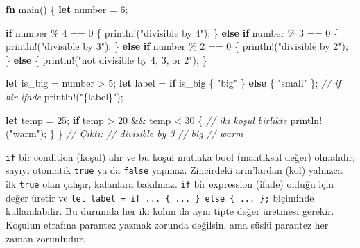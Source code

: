 \documentclass[12pt,a4paper]{article}
\newenvironment{Shaded}{}{}
\newcommand{\CommentTok}[1]{\textcolor[rgb]{0.38,0.63,0.69}{\textit{#1}}}
\newcommand{\ControlFlowTok}[1]{\textcolor[rgb]{0.00,0.44,0.13}{\textbf{#1}}}
\newcommand{\DecValTok}[1]{\textcolor[rgb]{0.25,0.63,0.44}{#1}}
\newcommand{\FunctionTok}[1]{\textcolor[rgb]{0.02,0.16,0.49}{#1}}
\newcommand{\KeywordTok}[1]{\textcolor[rgb]{0.00,0.44,0.13}{\textbf{#1}}}
\newcommand{\NormalTok}[1]{#1}
\newcommand{\OperatorTok}[1]{\textcolor[rgb]{0.40,0.40,0.40}{#1}}
\newcommand{\StringTok}[1]{\textcolor[rgb]{0.25,0.44,0.63}{#1}}
\begin{document}
\begin{Shaded}
\begin{Highlighting}[]
\KeywordTok{fn} \FunctionTok{main}\OperatorTok{()} \OperatorTok{\{}
    \KeywordTok{let}\NormalTok{ number }\OperatorTok{=} \DecValTok{6}\OperatorTok{;}

    \ControlFlowTok{if}\NormalTok{ number }\OperatorTok{\%} \DecValTok{4} \OperatorTok{==} \DecValTok{0} \OperatorTok{\{}
\NormalTok{        println}\OperatorTok{!(}\StringTok{"divisible by 4"}\OperatorTok{);}
    \OperatorTok{\}} \ControlFlowTok{else} \ControlFlowTok{if}\NormalTok{ number }\OperatorTok{\%} \DecValTok{3} \OperatorTok{==} \DecValTok{0} \OperatorTok{\{}
\NormalTok{        println}\OperatorTok{!(}\StringTok{"divisible by 3"}\OperatorTok{);}
    \OperatorTok{\}} \ControlFlowTok{else} \ControlFlowTok{if}\NormalTok{ number }\OperatorTok{\%} \DecValTok{2} \OperatorTok{==} \DecValTok{0} \OperatorTok{\{}
\NormalTok{        println}\OperatorTok{!(}\StringTok{"divisible by 2"}\OperatorTok{);}
    \OperatorTok{\}} \ControlFlowTok{else} \OperatorTok{\{}
\NormalTok{        println}\OperatorTok{!(}\StringTok{"not divisible by 4, 3, or 2"}\OperatorTok{);}
    \OperatorTok{\}}

    \KeywordTok{let}\NormalTok{ is\_big }\OperatorTok{=}\NormalTok{ number }\OperatorTok{\textgreater{}} \DecValTok{5}\OperatorTok{;}
    \KeywordTok{let}\NormalTok{ label }\OperatorTok{=} \ControlFlowTok{if}\NormalTok{ is\_big }\OperatorTok{\{} \StringTok{"big"} \OperatorTok{\}} \ControlFlowTok{else} \OperatorTok{\{} \StringTok{"small"} \OperatorTok{\};}  \CommentTok{// if bir ifade}
\NormalTok{    println}\OperatorTok{!(}\StringTok{"\{label\}"}\OperatorTok{);}

    \KeywordTok{let}\NormalTok{ temp }\OperatorTok{=} \DecValTok{25}\OperatorTok{;}
    \ControlFlowTok{if}\NormalTok{ temp }\OperatorTok{\textgreater{}} \DecValTok{20} \OperatorTok{\&\&}\NormalTok{ temp }\OperatorTok{\textless{}} \DecValTok{30} \OperatorTok{\{}                        \CommentTok{// iki koşul birlikte}
\NormalTok{        println}\OperatorTok{!(}\StringTok{"warm"}\OperatorTok{);}
    \OperatorTok{\}}
\OperatorTok{\}}
\CommentTok{// Çıktı:}
\CommentTok{// divisible by 3}
\CommentTok{// big}
\CommentTok{// warm}
\end{Highlighting}
\end{Shaded}

\texttt{if} bir condition (koşul) alır ve bu koşul mutlaka bool (mantıksal değer) olmalıdır; sayıyı otomatik \texttt{true} ya da \texttt{false} yapmaz. Zincirdeki arm'lardan (kol) yalnızca ilk \texttt{true} olan çalışır, kalanlara bakılmaz. \texttt{if} bir expression (ifade) olduğu için değer üretir ve \texttt{let\ label\ =\ if\ ...\ \{\ ...\ \}\ else\ \{\ ...\ \};} biçiminde kullanılabilir. Bu durumda her iki kolun da aynı tipte değer üretmesi gerekir. Koşulun etrafına parantez yazmak zorunda değilsin, ama süslü parantez her zaman zorunludur.
\end{document}
